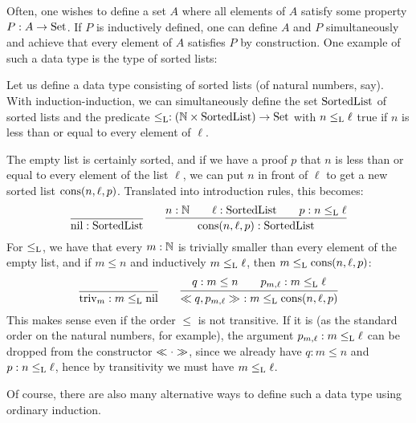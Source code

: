 \documentclass{article}
\begin{document}
Often, one wishes to define a set $A$ where all elements of $A$
satisfy some property $P : A \to \text{Set}$. If $P$ is inductively defined,
one can define $A$ and $P$ simultaneously and achieve that every
element of $A$ satisfies $P$ by construction. One example of such a
data type is the type of sorted lists:

\begin{example}
\label{ex:sorted-list}

Let us define a data type consisting of sorted lists (of natural
numbers, say). With induction-induction, we can simultaneously define
the set $\text{SortedList}$ of sorted lists and the predicate $\leq_{\text{L}} :
(\mathbb{N} \times \text{SortedList}) \to \text{Set}$ with $n \leq_{\text{L}} \ell$ true if
$n$ is less than or equal to every element of $\ell$.

The empty list is certainly sorted, and if we have a proof $p$ that
$n$ is less than or equal to every element of the list $\ell$, we can
put $n$ in front of $\ell$ to get a new sorted list
$\text{cons}(n, \ell, p)$. Translated into introduction rules, this becomes:
\[
\infer{\nilList : \SortedList}{} \qquad
\infer{\consList{n}{\ell}{p} : \SortedList}{n : \Nat \quad & \ell : \SortedList \quad & p : n \lessList \ell}
\]
For $\leq_{\text{L}}$, we have that every $m : \mathbb{N}$ is trivially smaller
than every element of the empty list, and if $m \leq n$ and
inductively $m \leq_{\text{L}} \ell$, then $m \leq_{\text{L}} \text{cons}(n, \ell, p)$:
\[
\infer{\nilLess{m} : m \lessList \nilList}
{} \qquad
\infer{\consLess{n}{\ell}{p}{m}{q}{p_{m, \ell}}\ : m \lessList \consList{n}{\ell}{p}}
       {q : m \leq n \quad & p_{m, \ell} : m \lessList \ell}
\]
This makes sense even if the order $\leq$ is not transitive. If it is
(as the standard order on the natural numbers, for example), the
argument $p_{m, \ell} : m \leq_{\text{L}} \ell$ can be dropped from the
constructor $\ll \cdot \gg$, since we already have $q : m \leq n$ and
$p : n \leq_{\text{L}} \ell$, hence by transitivity we must have $m
\leq_{\text{L}} \ell$.

 Of course, there are also many alternative ways to define such a data type
 using ordinary induction.
\blackqed
\end{example}
\end{document}
